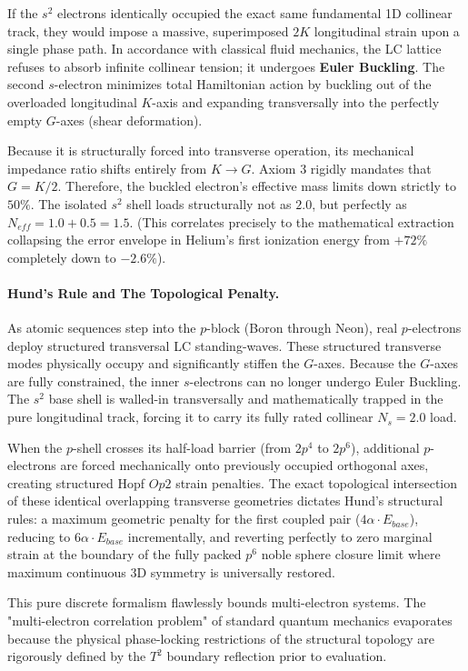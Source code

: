 If the $s^2$ electrons identically occupied the exact same fundamental 1D collinear track, they would impose a massive, superimposed $2K$ longitudinal strain upon a single phase path. In accordance with classical fluid mechanics, the LC lattice refuses to absorb infinite collinear tension; it undergoes \textbf{Euler Buckling}. The second $s$-electron minimizes total Hamiltonian action by buckling out of the overloaded longitudinal $K$-axis and expanding transversally into the perfectly empty $G$-axes (shear deformation). 

Because it is structurally forced into transverse operation, its mechanical impedance ratio shifts entirely from $K \to G$. Axiom 3 rigidly mandates that $G = K/2$. Therefore, the buckled electron's effective mass limits down strictly to $50\%$. The isolated $s^2$ shell loads structurally not as $2.0$, but perfectly as $N_{eff} = 1.0 + 0.5 = 1.5$. (This correlates precisely to the mathematical extraction collapsing the error envelope in Helium's first ionization energy from $+72\%$ completely down to $-2.6\%$).

\paragraph{Hund's Rule and The Topological Penalty.}
As atomic sequences step into the $p$-block (Boron through Neon), real $p$-electrons deploy structured transversal LC standing-waves. These structured transverse modes physically occupy and significantly stiffen the $G$-axes. 
Because the $G$-axes are fully constrained, the inner $s$-electrons can no longer undergo Euler Buckling. The $s^2$ base shell is walled-in transversally and mathematically trapped in the pure longitudinal track, forcing it to carry its fully rated collinear $N_s = 2.0$ load. 

When the $p$-shell crosses its half-load barrier (from $2p^4$ to $2p^6$), additional $p$-electrons are forced mechanically onto previously occupied orthogonal axes, creating structured Hopf $Op2$ strain penalties. The exact topological intersection of these identical overlapping transverse geometries dictates Hund's structural rules: a maximum geometric penalty for the first coupled pair ($4\alpha \cdot E_{base}$), reducing to $6\alpha \cdot E_{base}$ incrementally, and reverting perfectly to zero marginal strain at the boundary of the fully packed $p^6$ noble sphere closure limit where maximum continuous 3D symmetry is universally restored.

This pure discrete formalism flawlessly bounds multi-electron systems. The "multi-electron correlation problem" of standard quantum mechanics evaporates because the physical phase-locking restrictions of the structural topology are rigorously defined by the $T^2$ boundary reflection prior to evaluation. 

